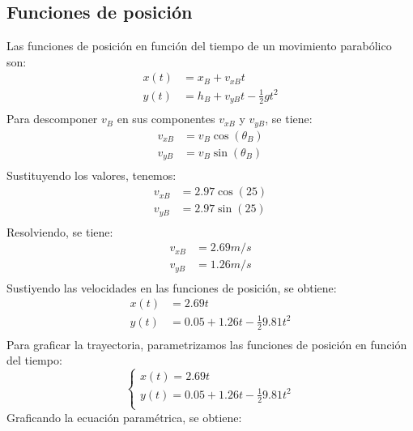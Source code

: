 \documentclass{article}
\begin{document}
        \subsection{Funciones de posición}
        Las funciones de posición en función del tiempo de un movimiento parabólico son:
        \begin{align*}
            x(t) &= x_B + v_{xB} t \\
            y(t) &= h_B + v_{yB} t - \frac{1}{2} g t^2 \\
        \end{align*}
        Para descomponer $v_B$ en sus componentes $v_{xB}$ y $v_{yB}$, se tiene:
        \begin{align*}
            v_{xB} &= v_B \cos(\theta_B) \\
            v_{yB} &= v_B \sin(\theta_B) \\
        \end{align*}
        Sustituyendo los valores, tenemos:
        \begin{align*}
            v_{xB} &= 2.97 \cos(25) \\
            v_{yB} &= 2.97 \sin(25) \\
        \end{align*}
        Resolviendo, se tiene:
        \begin{align*}
            v_{xB} &= 2.69 \si{m/s} \\
            v_{yB} &= 1.26 \si{m/s} \\
        \end{align*}
        Sustiyendo las velocidades en las funciones de posición, se obtiene:
        \begin{align*}
            x(t) &= 2.69 t \\
            y(t) &= 0.05 + 1.26 t - \frac{1}{2} 9.81 t^2 \\
        \end{align*}
        Para graficar la trayectoria, parametrizamos las funciones de posición en función del tiempo:
        \[
        \begin{cases}
            x(t) = 2.69 t \\
            y(t) = 0.05 + 1.26 t - \frac{1}{2} 9.81 t^2 \\
        \end{cases}
        \]
        Graficando la ecuación paramétrica, se obtiene:
\end{document}
